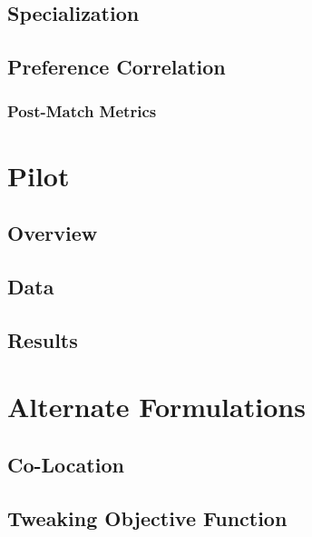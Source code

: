\documentclass{article}
\begin{document}


\subsection{Specialization}



\subsection{Preference Correlation}



\subsubsection{Post-Match Metrics}



\section{Pilot}

\subsection{Overview}



\subsection{Data}



\subsection{Results}

\section{Alternate Formulations}

\subsection{Co-Location}



\subsection{Tweaking Objective Function}
\end{document}
